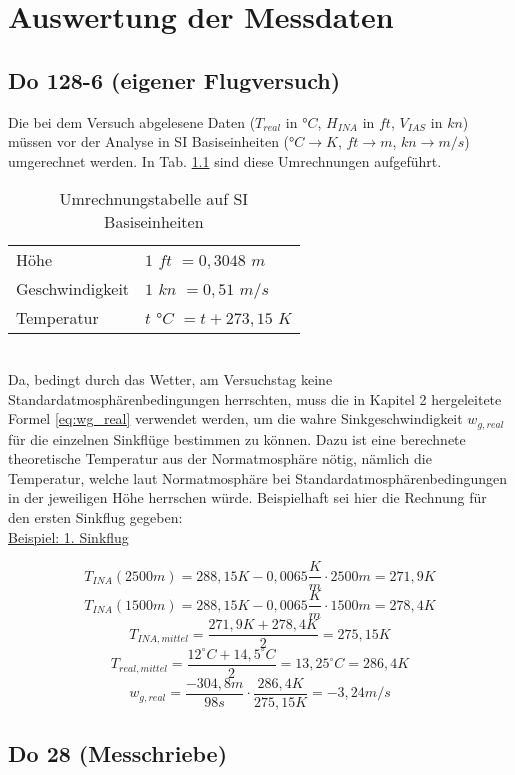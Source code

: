 \chapter{Auswertung der Messdaten}
\label{chapter:auswertung}

\section{Do 128-6 (eigener Flugversuch)}
Die bei dem Versuch abgelesene Daten ($T_{real}$ in °$C$, $H_{INA}$ in $ft$, $V_{IAS}$ in $kn$) müssen vor der Analyse in SI Basiseinheiten (°$C  \rightarrow K$, $ft \rightarrow m$, $kn \rightarrow m/s$) umgerechnet werden. In Tab. \ref{tab:umrechnung_einheiten} sind diese Umrechnungen aufgeführt.
\begin{table}[h]
	\centering
	\begin{tabular}{l l}
		\hline
		Höhe & $1$ $ft$ $=0,3048$ $m$ \\
		Geschwindigkeit&   $1$ $kn$ $=0,51$ $m/s$\\
		Temperatur &  $t$ °$C$ $=t+273,15$ $K$\\
		\hline		
	\end{tabular}
	\caption{Umrechnungstabelle auf SI Basiseinheiten} \label{tab:umrechnung_einheiten}
\end{table} \\
Da, bedingt durch das Wetter, am Versuchstag keine Standardatmosphärenbedingungen herrschten, muss die in Kapitel 2 hergeleitete Formel \ref{eq:wg_real} verwendet werden, um die wahre Sinkgeschwindigkeit $w_{g,real}$ für die einzelnen Sinkflüge bestimmen zu können. Dazu ist eine berechnete theoretische Temperatur aus der Normatmosphäre nötig, nämlich die Temperatur, welche laut Normatmosphäre bei Standardatmosphärenbedingungen in der jeweiligen Höhe herrschen würde. Beispielhaft sei hier die Rechnung für den ersten Sinkflug gegeben:\\

\underline{Beispiel: 1. Sinkflug}

\begin{equation}
T_{INA}(2500m) = 288,15 K - 0,0065 \frac{K}{m} \cdot 2500m = 271,9 K
\end{equation}
\begin{equation}
T_{INA}(1500m) = 288,15 K - 0,0065 \frac{K}{m} \cdot 1500m = 278,4 K
\end{equation}
\begin{equation}
T_{INA,mittel} = \frac{271,9K + 278,4K}{2} = 275,15 K
\end{equation}
\begin{equation}
T_{real,mittel} = \frac{12^\circ C + 14,5^\circ C}{2} = 13,25^\circ C =	286,4 K
\end{equation}
\begin{equation}
w_{g,real} = \frac{-304,8 m}{98s} \cdot \frac{286,4K}{275,15K} = - 3,24m/s
\end{equation}


\section{Do 28 (Messchriebe)}

\newpage